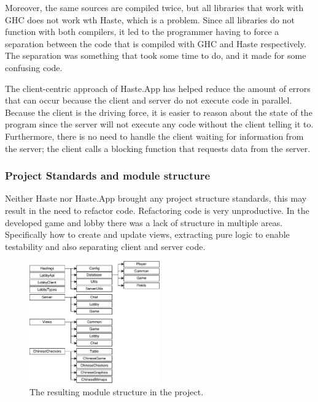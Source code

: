 \documentclass[a4paper]{article}
\begin{document}
Moreover, the same sources are compiled twice, but all libraries that work with GHC does not work wth Haste, which is a problem. Since all libraries do not function with both compilers, it led to the programmer having to force a separation between the code that is compiled with GHC and Haste respectively. The separation was something that took some time to do, and it made for some confusing code.

The client-centric approach of Haste.App has helped reduce the amount of errors that can occur because the client and server do not execute code in parallel. Because the client is the driving force, it is easier to reason about the state of the program since the server will not execute any code without the client telling it to. Furthermore, there is no need to handle the client waiting for information from the server; the client calls a blocking function that requests data from the server.


\subsubsection{Project Standards and module structure}
Neither Haste nor Haste.App brought any project structure standards, this may result in the need to refactor code. Refactoring code is very unproductive. In the developed game and lobby there was a lack of structure in multiple areas. Specifically how to create and update views, extracting pure logic to enable testability and also separating client and server code.

\begin{figure}[h]
    \centering
    \includegraphics[scale=0.3,width=0.5\textwidth]{figure/module-dependencies}
    \caption{The resulting module structure in the project.}
    \label{fig:module-dependencies}
\end{figure}
\end{document}
